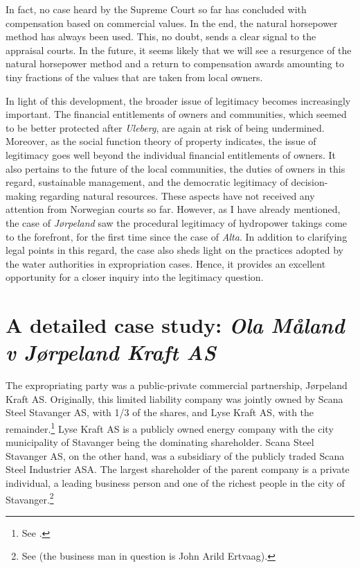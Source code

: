 In fact, no case heard by the Supreme Court so far has concluded with compensation based on commercial  values. In the end, the natural horsepower method has always been used. This, no doubt, sends a clear signal to the appraisal courts. In the future, it seems likely that we will see a resurgence of the natural horsepower method and a return to compensation awards amounting to tiny fractions of the values that are taken from local owners.

In light of this development, the broader issue of legitimacy becomes increasingly important. The financial entitlements of owners and communities, which seemed to be better protected after {\it Uleberg}, are again at risk of being undermined. Moreover, as the social function theory of property indicates, the issue of legitimacy goes well beyond the individual financial entitlements of owners. It also pertains to the future of the local communities, the duties of owners in this regard, sustainable management, and the democratic legitimacy of decision-making regarding natural resources. These aspects have not received any attention from Norwegian courts so far. However, as I have already mentioned, the case of {\it Jørpeland} saw the procedural legitimacy of hydropower takings come to the forefront, for the first time since the case of {\it Alta}. In addition to clarifying legal points in this regard, the case also sheds light on the practices adopted by the water authorities in expropriation cases. Hence, it provides an excellent opportunity for a closer inquiry into the legitimacy question.

\section{A detailed case study: {\it Ola Måland v Jørpeland Kraft AS}}\label{sec:5:6}

The expropriating party was a public-private commercial partnership, Jørpeland Kraft AS. Originally, this limited liability company was jointly owned by Scana Steel Stavanger AS, with 1/3 of the shares, and Lyse Kraft AS, with the remainder.\footnote{See \cite[2]{jorpeland09}.} Lyse Kraft AS is a publicly owned energy company with the city municipality of Stavanger being the dominating shareholder. Scana Steel Stavanger AS, on the other hand, was a subsidiary of the publicly traded Scana Steel Industrier ASA. The largest shareholder of the parent company is a private individual, a leading business person and one of the richest people in the city of Stavanger.\footnote{See \cite{birkevold09} (the business man in question is John Arild Ertvaag).}


